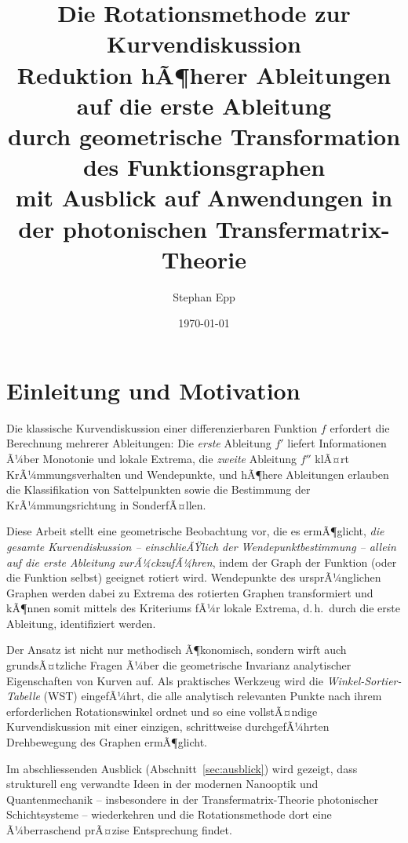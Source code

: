 ﻿\documentclass[12pt, a4paper]{article}
\title{
	\textbf{Die Rotationsmethode zur Kurvendiskussion} \\
	\large Reduktion hÃ¶herer Ableitungen auf die erste Ableitung \\
	durch geometrische Transformation des Funktionsgraphen \\[1ex]
	\normalsize mit Ausblick auf Anwendungen in der photonischen Transfermatrix-Theorie
}
\author{Stephan Epp}
\date{\today}
\theoremstyle{definition}
\begin{document}
	
	\maketitle
	\tableofcontents
	\newpage
	
	\section{Einleitung und Motivation}
	
	Die klassische Kurvendiskussion einer differenzierbaren Funktion $f$ erfordert
	die Berechnung mehrerer Ableitungen: Die \emph{erste} Ableitung $f'$ liefert
	Informationen Ã¼ber Monotonie und lokale Extrema, die \emph{zweite} Ableitung
	$f''$ klÃ¤rt KrÃ¼mmungsverhalten und Wendepunkte, und hÃ¶here Ableitungen
	erlauben die Klassifikation von Sattelpunkten sowie die Bestimmung der
	KrÃ¼mmungsrichtung in SonderfÃ¤llen.
	
	Diese Arbeit stellt eine geometrische Beobachtung vor, die es ermÃ¶glicht,
	\emph{die gesamte Kurvendiskussion -- einschlieÃŸlich der Wendepunktbestimmung
		-- allein auf die erste Ableitung zurÃ¼ckzufÃ¼hren}, indem der Graph der
	Funktion (oder die Funktion selbst) geeignet rotiert wird. Wendepunkte des
	ursprÃ¼nglichen Graphen werden dabei zu Extrema des rotierten Graphen
	transformiert und kÃ¶nnen somit mittels des Kriteriums fÃ¼r lokale Extrema,
	d.\,h.\ durch die erste Ableitung, identifiziert werden.
	
	Der Ansatz ist nicht nur methodisch Ã¶konomisch, sondern wirft auch
	grundsÃ¤tzliche Fragen Ã¼ber die geometrische Invarianz analytischer
	Eigenschaften von Kurven auf. Als praktisches Werkzeug wird die
	\emph{Winkel-Sortier-Tabelle} (WST) eingefÃ¼hrt, die alle analytisch
	relevanten Punkte nach ihrem erforderlichen Rotationswinkel ordnet und
	so eine vollstÃ¤ndige Kurvendiskussion mit einer einzigen, schrittweise
	durchgefÃ¼hrten Drehbewegung des Graphen ermÃ¶glicht.
	
	Im abschliessenden Ausblick (Abschnitt~\ref{sec:ausblick}) wird gezeigt,
	dass strukturell eng verwandte Ideen in der modernen Nanooptik und
	Quantenmechanik -- insbesondere in der Transfermatrix-Theorie photonischer
	Schichtsysteme -- wiederkehren und die Rotationsmethode dort eine
	Ã¼berraschend prÃ¤zise Entsprechung findet.
	
\end{document}
